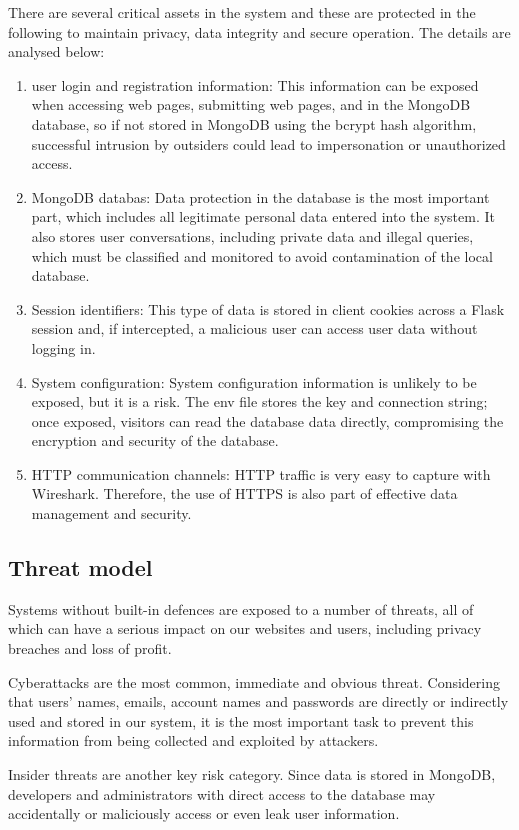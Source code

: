 \documentclass{article}
\begin{document}
There are several critical assets in the system and these are protected in the following to maintain privacy, data integrity and secure operation. The details are analysed below:

\begin{enumerate}
    \item user login and registration information: This information can be exposed when accessing web pages, submitting web pages, and in the MongoDB database, so if not stored in MongoDB using the bcrypt hash algorithm, successful intrusion by outsiders could lead to impersonation or unauthorized access.
    \item MongoDB databas: Data protection in the database is the most important part, which includes all legitimate personal data entered into the system. It also stores user conversations, including private data and illegal queries, which must be classified and monitored to avoid contamination of the local database.
    \item Session identifiers: This type of data is stored in client cookies across a Flask session and, if intercepted, a malicious user can access user data without logging in.
    \item System configuration: System configuration information is unlikely to be exposed, but it is a risk. The env file stores the key and connection string; once exposed, visitors can read the database data directly, compromising the encryption and security of the database.
    \item HTTP communication channels: HTTP traffic is very easy to capture with Wireshark. Therefore, the use of HTTPS is also part of effective data management and security.
\end{enumerate}

\subsection{Threat model}
Systems without built-in defences are exposed to a number of threats, all of which can have a serious impact on our websites and users, including privacy breaches and loss of profit. 

Cyberattacks are the most common, immediate and obvious threat. Considering that users' names, emails, account names and passwords are directly or indirectly used and stored in our system, it is the most important task to prevent this information from being collected and exploited by attackers. 

Insider threats are another key risk category. Since data is stored in MongoDB, developers and administrators with direct access to the database may accidentally or maliciously access or even leak user information. 
\end{document}
